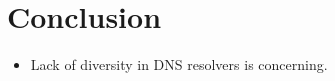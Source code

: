 \section{Conclusion}
\label{sec:conclusion}
\begin{itemize}
	\item Lack of diversity in DNS resolvers is concerning.
\end{itemize}
